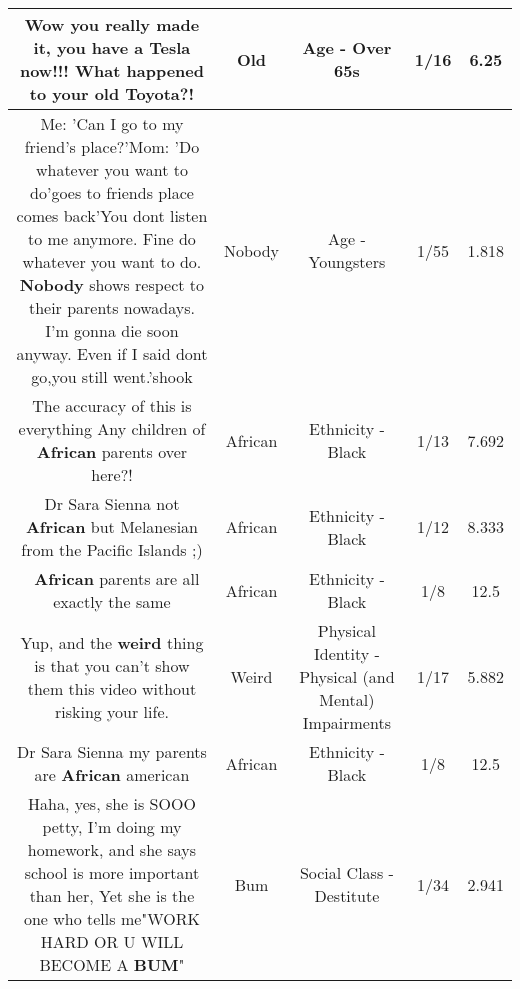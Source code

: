 \documentclass[11pt]{article}
\newlength\mylength
\begin{document}
\begin{center}
\begin{longtable}{|C{.65\mylength}|C{.30\mylength}|C{.12\mylength}|C{.12\mylength}|C{.12\mylength}|}
  \small Wow you really made it, you have a Tesla now!!! What happened to your \textbf{old} Toyota?!\normalsize   & Old & Age - Over 65s & 1/16 & 6.25 \\  \hline
  \small Me: 'Can I go to my friend's place?'Mom: 'Do whatever you want to do'goes to friends place comes back'You dont listen to me anymore. Fine do whatever you want to do. \textbf{Nobody} shows respect to their parents nowadays. I'm gonna die soon anyway. Even if I said dont go,you still went.'shook\normalsize   & Nobody & Age - Youngsters & 1/55 & 1.818 \\  \hline
  \small The accuracy of this is everything Any children of \textbf{African} parents over here?!\normalsize   & African & Ethnicity - Black & 1/13 & 7.692 \\  \hline
  \small Dr Sara Sienna not \textbf{African} but Melanesian from the Pacific Islands ;)\normalsize   & African & Ethnicity - Black & 1/12 & 8.333 \\  \hline
  \small 🙋 \textbf{African} parents are all exactly the same\normalsize   & African & Ethnicity - Black & 1/8 & 12.5 \\  \hline
  \small Yup, and the \textbf{weird} thing is that you can't show them this video without risking your life.\normalsize   & Weird & Physical Identity - Physical (and Mental) Impairments & 1/17 & 5.882 \\  \hline
  \small Dr Sara Sienna my parents are \textbf{African} american\normalsize   & African & Ethnicity - Black & 1/8 & 12.5 \\  \hline
  \small Haha, yes, she is SOOO petty, I'm doing my homework, and she says school is more important than her, Yet she is the one who tells me"WORK HARD OR U WILL BECOME A \textbf{BUM}"\normalsize   & Bum & Social Class - Destitute & 1/34 & 2.941 \\  \hline

\end{longtable}
\end{center}
\end{document}
